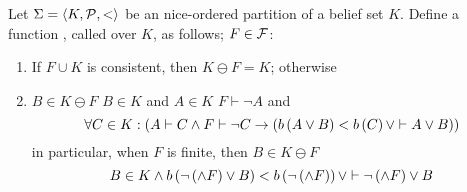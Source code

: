 \begin{defi}
Let $\Sigma=\left\langle K,\mathcal{P},<\right\rangle$ be an nice-ordered partition of a belief set $K$. Define a function \funsig{\ominus}{\calF}{\calF}, called  over $K$, as follows; \faTx{} $F\in\mathcal{F}$:
\begin{enumerate}
 \item If $F\cup K$ is consistent, then $K\ominus F=K$; otherwise
 \item $B\in K\ominus F$ \iffTx{} $B\in K$ and \teTx{} $A\in K$ \stTx{} $F\vdash\neg A$ and
 \begin{equation}
  \forall C\in K:\left( A\vdash C\wedge F\vdash\neg C\rightarrow \left( b\left(A\vee B\right)<b\left(C\right)\vee\vdash A\vee B\right)\right)
 \end{equation}
 in particular, when $F$ is finite, then $B\in K\ominus F$ \iffTx{}
 \begin{equation}
  B\in K\wedge b\left(\neg\left( \wedge F\right)\vee B\right)<b\left(\neg\left( \wedge F\right)\right)\vee\vdash\neg\left( \wedge F\right)\vee B
 \end{equation}
\end{enumerate}
\cite{conf/ijcai/ZhangCZC97}
\end{defi}

